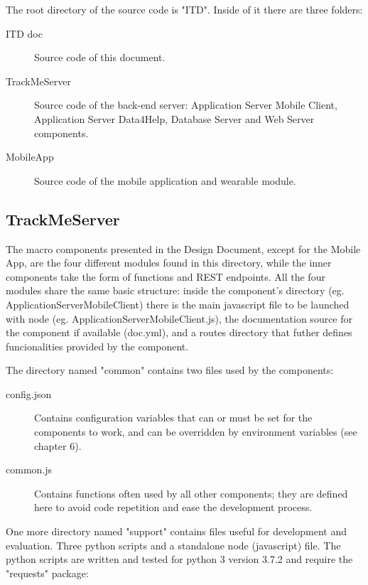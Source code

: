 \documentclass[../main.tex]{subfiles}
\begin{document}
The root directory of the source code is "ITD". Inside of it there are three folders:

\begin{description}
	\item[ITD doc] Source code of this document.
	\item[TrackMeServer] Source code of the back-end server: Application Server Mobile Client, Application Server Data4Help, Database Server and Web Server components.
	\item[MobileApp] Source code of the mobile application and wearable module.
\end{description}

\subsection{TrackMeServer}

The macro components presented in the Design Document, except for the Mobile App, are the four different modules found in this directory, while the inner components take the form of functions and REST endpoints. All the four modules share the same basic structure: inside the component's directory (eg. ApplicationServerMobileClient) there is the main javascript file to be launched with node (eg. ApplicationServerMobileClient.js), the documentation source for the component if available (doc.yml), and a routes directory that futher defines funcionalities provided by the component.

The directory named "common" contains two files used by the components:

\begin{description}
	\item[config.json] Contains configuration variables that can or must be set for the components to work, and can be overridden by environment variables (see chapter 6).
	\item[common.js] Contains functions often used by all other components; they are defined here to avoid code repetition and ease the development process.
\end{description}

One more directory named "support" contains files useful for development and evaluation. Three python scripts and a standalone node (javascript) file. The python scripts are written and tested for python 3 version 3.7.2 and require the "requests" package:
\end{document}
